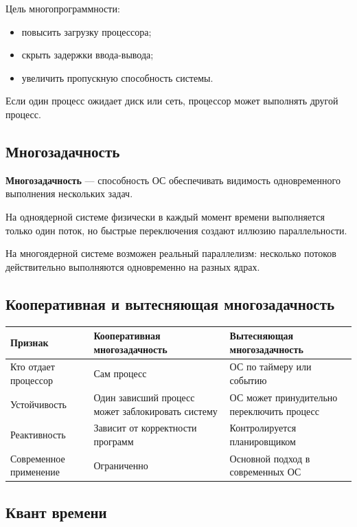 \documentclass[12pt,a4paper]{article}
\begin{document}
Цель многопрограммности:
\begin{itemize}
    \item повысить загрузку процессора;
    \item скрыть задержки ввода-вывода;
    \item увеличить пропускную способность системы.
\end{itemize}

Если один процесс ожидает диск или сеть, процессор может выполнять другой процесс.

\subsection{Многозадачность}

\textbf{Многозадачность} --- способность ОС обеспечивать видимость одновременного выполнения нескольких задач.

На одноядерной системе физически в каждый момент времени выполняется только один поток, но быстрые переключения создают иллюзию параллельности.

На многоядерной системе возможен реальный параллелизм: несколько потоков действительно выполняются одновременно на разных ядрах.

\subsection{Кооперативная и вытесняющая многозадачность}

\begin{longtable}{|p{4cm}|p{5cm}|p{5cm}|}
\hline
\textbf{Признак} & \textbf{Кооперативная многозадачность} & \textbf{Вытесняющая многозадачность} \\
\hline
Кто отдает процессор & Сам процесс & ОС по таймеру или событию \\
\hline
Устойчивость & Один зависший процесс может заблокировать систему & ОС может принудительно переключить процесс \\
\hline
Реактивность & Зависит от корректности программ & Контролируется планировщиком \\
\hline
Современное применение & Ограниченно & Основной подход в современных ОС \\
\hline
\end{longtable}

\subsection{Квант времени}
\end{document}
